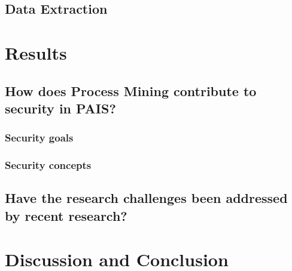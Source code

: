 \documentclass[runningheads]{llncs}
\begin{document}
\subsection{Data Extraction}\label{Extraction}

\section{Results}\label{Results}
\subsection{How does Process Mining contribute to security in PAIS?}\label{Q1}
\subsubsection{Security goals}\label{goals}
\subsubsection{Security concepts}\label{concepts}
\subsection{Have the research challenges been addressed by recent research?}\label{Q2}

\section{Discussion and Conclusion}\label{Conclusion}

%
%
% 
% 
%

{}
\end{document}
